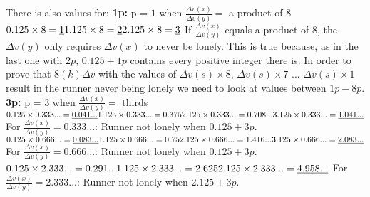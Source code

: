 \documentclass[12pt, a4paper]{article}
\begin{document}
\newline
\newline
There is also values for: \newline
\textbf{1p:}
p = $1$ when $\frac{\Delta v(x)}{\Delta v(y)} =$ a product of $8$
\newline
\newline
$0.125\times8 = \underline{1} \newline 1.125\times8 = \underline{2} \newline 2.125\times8 = \underline{3}$
\newline
\newline
If $\frac{\Delta v(x)}{\Delta v(y)}$ equals a product of $8$, the $\Delta v(y)$ only requires $\Delta v(x)$ to never be lonely. This is true because, as in the last one with $2p$, $0.125+1p$ contains every positive integer there is. In order to prove that $8 (k) \Delta v$ with the values of $\Delta v(s)\times8$, $\Delta v(s)\times7$ ... $\Delta v(s)\times1$ result in the runner never being lonely we need to look at values between $1p-8p$.
\newline
\newline
\textbf{3p:}
p = $3$ when $\frac{\Delta v(x)}{\Delta v(y)} =$ thirds
\newline
\newline
$0.125\times0.333... = \underline{0.041...} \newline 1.125\times0.333... = 0.375 \newline 2.125\times0.333... = 0.708... \newline 3.125\times0.333... = \underline{1.041...} \newline$ For $\frac{\Delta v(x)}{\Delta v(y)} = 0.333...$: Runner not lonely when $0.125+3p$.
\newline
\newline
$0.125\times0.666... = \underline{0.083...} \newline 1.125\times0.666... = 0.75 \newline 2.125\times0.666... = 1.416... \newline 3.125\times0.666... = \underline{2.083...} \newline$ For $\frac{\Delta v(x)}{\Delta v(y)} = 0.666...$: Runner not lonely when $0.125+3p$.
\newline
\newline
$0.125\times2.333... = 0.291... \newline 1.125\times2.333... = 2.625 \newline 2.125\times2.333... = \underline{4.958...} \newline$ For $\frac{\Delta v(x)}{\Delta v(y)} = 2.333...$: Runner not lonely when $2.125+3p$.
\end{document}
